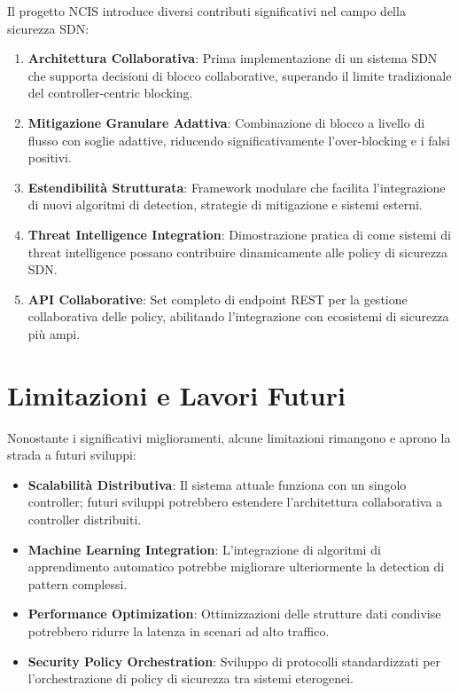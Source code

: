 Il progetto NCIS introduce diversi contributi significativi nel campo della sicurezza SDN:

\begin{enumerate}
    \item \textbf{Architettura Collaborativa}: Prima implementazione di un sistema SDN che supporta decisioni di blocco collaborative, superando il limite tradizionale del controller-centric blocking.
    
    \item \textbf{Mitigazione Granulare Adattiva}: Combinazione di blocco a livello di flusso con soglie adattive, riducendo significativamente l'over-blocking e i falsi positivi.
    
    \item \textbf{Estendibilità Strutturata}: Framework modulare che facilita l'integrazione di nuovi algoritmi di detection, strategie di mitigazione e sistemi esterni.
    
    \item \textbf{Threat Intelligence Integration}: Dimostrazione pratica di come sistemi di threat intelligence possano contribuire dinamicamente alle policy di sicurezza SDN.
    
    \item \textbf{API Collaborative}: Set completo di endpoint REST per la gestione collaborativa delle policy, abilitando l'integrazione con ecosistemi di sicurezza più ampi.
\end{enumerate}

\section{Limitazioni e Lavori Futuri}

Nonostante i significativi miglioramenti, alcune limitazioni rimangono e aprono la strada a futuri sviluppi:

\begin{itemize}
    \item \textbf{Scalabilità Distributiva}: Il sistema attuale funziona con un singolo controller; futuri sviluppi potrebbero estendere l'architettura collaborativa a controller distribuiti.
    
    \item \textbf{Machine Learning Integration}: L'integrazione di algoritmi di apprendimento automatico potrebbe migliorare ulteriormente la detection di pattern complessi.
    
    \item \textbf{Performance Optimization}: Ottimizzazioni delle strutture dati condivise potrebbero ridurre la latenza in scenari ad alto traffico.
    
    \item \textbf{Security Policy Orchestration}: Sviluppo di protocolli standardizzati per l'orchestrazione di policy di sicurezza tra sistemi eterogenei.
\end{itemize}

